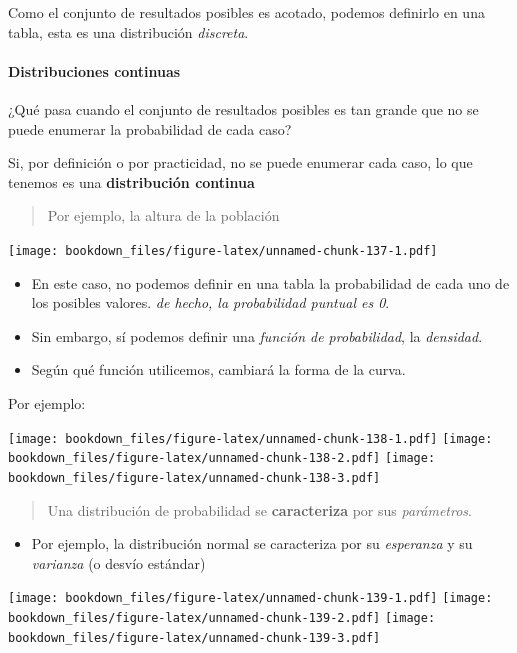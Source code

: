 \documentclass[]{book}
\providecommand{\tightlist}{%
  \setlength{\itemsep}{0pt}\setlength{\parskip}{0pt}}
\let\oldparagraph\paragraph
\renewcommand{\paragraph}[1]{\oldparagraph{#1}\mbox{}}
\begin{document}
Como el conjunto de resultados posibles es acotado, podemos definirlo en una tabla, esta es una distribución \emph{discreta}.

\hypertarget{distribuciones-continuas}{%
\paragraph{Distribuciones continuas}\label{distribuciones-continuas}}

¿Qué pasa cuando el conjunto de resultados posibles es tan grande que no se puede enumerar la probabilidad de cada caso?

Si, por definición o por practicidad, no se puede enumerar cada caso, lo que tenemos es una \textbf{distribución continua}

\begin{quote}
Por ejemplo, la altura de la población
\end{quote}

\texttt{[image: bookdown\_files/figure-latex/unnamed-chunk-137-1.pdf]}

\begin{itemize}
\item
  En este caso, no podemos definir en una tabla la probabilidad de cada uno de los posibles valores. \emph{de hecho, la probabilidad puntual es 0}.
\item
  Sin embargo, sí podemos definir una \emph{función de probabilidad}, la \emph{densidad}.
\item
  Según qué función utilicemos, cambiará la forma de la curva.
\end{itemize}

Por ejemplo:

\texttt{[image: bookdown\_files/figure-latex/unnamed-chunk-138-1.pdf]} \texttt{[image: bookdown\_files/figure-latex/unnamed-chunk-138-2.pdf]} \texttt{[image: bookdown\_files/figure-latex/unnamed-chunk-138-3.pdf]}

\begin{quote}
Una distribución de probabilidad se \textbf{caracteriza} por sus \emph{parámetros}.
\end{quote}

\begin{itemize}
\tightlist
\item
  Por ejemplo, la distribución normal se caracteriza por su \emph{esperanza} y su \emph{varianza} (o desvío estándar)
\end{itemize}

\texttt{[image: bookdown\_files/figure-latex/unnamed-chunk-139-1.pdf]} \texttt{[image: bookdown\_files/figure-latex/unnamed-chunk-139-2.pdf]} \texttt{[image: bookdown\_files/figure-latex/unnamed-chunk-139-3.pdf]}
\end{document}
